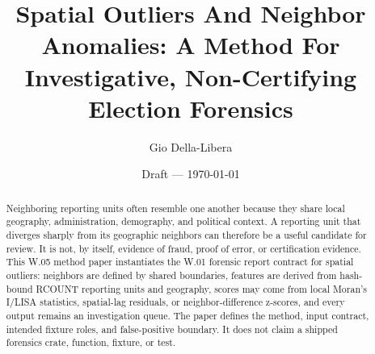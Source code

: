 \documentclass[12pt]{article}
\title{Spatial Outliers And Neighbor Anomalies:
A Method For Investigative, Non-Certifying Election Forensics}
\author{Gio Della-Libera}
\date{Draft --- \today}
\begin{document}
\maketitle

\begin{abstract}
Neighboring reporting units often resemble one another because they share local
geography, administration, demography, and political context. A reporting unit
that diverges sharply from its geographic neighbors can therefore be a useful
candidate for review. It is not, by itself, evidence of fraud, proof of error,
or certification evidence. This W.05 method paper instantiates the W.01
forensic report contract for spatial outliers: neighbors are defined by shared
boundaries, features are derived from hash-bound RCOUNT reporting units and
geography, scores may come from local Moran's I/LISA statistics, spatial-lag
residuals, or neighbor-difference z-scores, and every output remains an
investigation queue. The paper defines the method, input contract, intended
fixture roles, and false-positive boundary. It does not claim a shipped
forensics crate, function, fixture, or test.
\end{abstract}








\nocite{rcount-overview-2026,w-series-spatial-outliers-2026}


\end{document}
